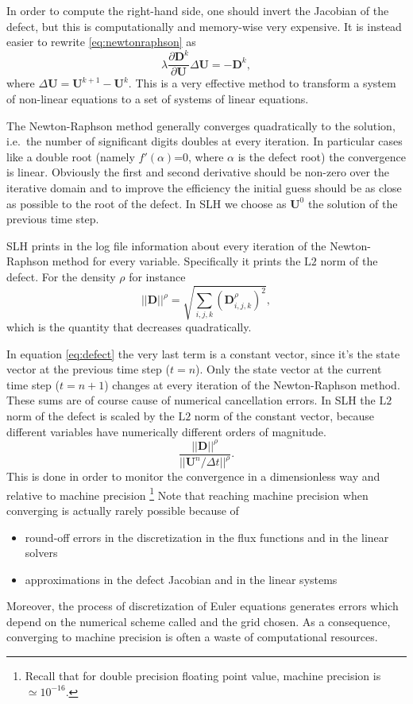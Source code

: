 In order to compute the right-hand side, one should invert the Jacobian of the defect, but this is computationally and memory-wise very expensive. It is instead easier to rewrite \ref{eq:newtonraphson} as 
\begin{equation}
	\lambda \frac{\partial \mathbf{D}^k}{\partial \mathbf{U}} \Delta \mathbf{U} = - \mathbf{D}^k,
\end{equation}
where $\Delta \mathbf{U}=\mathbf{U}^{k+1} - \mathbf{U}^k$. This is a very effective method to transform a system of non-linear equations to a set of systems of linear equations.

The Newton-Raphson method generally converges quadratically to the solution, i.e.\ the number of significant digits doubles at every iteration. In particular cases like a double root (namely $f'(\alpha)$=0, where $\alpha$ is the defect root) the convergence is linear. Obviously the first and second derivative should be non-zero over the iterative domain and to improve the efficiency the initial guess should be as close as possible to the root of the defect. In SLH we choose as $\mathbf{U}^0$ the solution of the previous time step.

SLH prints in the log file information about every iteration of the Newton-Raphson method for every variable. Specifically it prints the $\mathrm{L2}$ norm of the defect. For the density $\rho$ for instance
\begin{equation}\label{eq:l2defect}
	||\mathbf{D}||^{\rho} = \sqrt{ \sum_{i, j, k} \left( \mathbf{D}^{\rho}_{i, j, k}  \right)^2},
\end{equation}
which is the quantity that decreases quadratically.

In equation \ref{eq:defect} the very last term is a constant vector, since it's the state vector at the previous time step ($t=n$). Only the state vector at the current time step ($t=n+1$) changes at every iteration of the Newton-Raphson method. These sums are of course cause of numerical cancellation errors. In SLH the $\mathrm{L2}$ norm of the defect is scaled by the $\mathrm{L2}$ norm of the constant vector, because different variables have numerically different orders of magnitude.
\begin{equation}
	\frac{||\mathbf{D}||^{\rho}}{||\mathbf{U}^n / \Delta t||^{\rho}}.
\end{equation}
This is done in order to monitor the convergence in a dimensionless way and relative to machine precision \footnote{Recall that for double precision floating point value, machine precision is $\simeq 10^{-16}$. }
Note that reaching machine precision when converging is actually rarely possible because of
\begin{itemize}
	\item{round-off errors in the discretization in the flux functions and in the linear solvers}
	\item{approximations in the defect Jacobian and in the linear systems}
\end{itemize}
Moreover, the process of discretization of Euler equations generates errors which depend on the numerical scheme called and the grid chosen. As a consequence, converging to machine precision is often a waste of computational resources.
